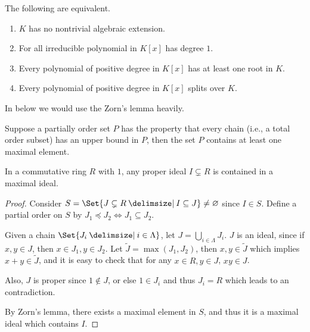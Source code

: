 \begin{prop}
  The following are equivalent.
  \begin{enumerate}
    \item $K$ has no nontrivial algebraic extension.
    \item For all irreducible polynomial in $K[x]$ has degree $1$.
    \item Every polynomial of  positive degree in $K[x]$ has at least one root in $K$.
    \item Every polynomial of  positive degree in $K[x]$ splits over $K$.
  \end{enumerate}
\end{prop}

In below we would use the Zorn's lemma heavily.
\begin{lemma}
  Suppose a partially order set $P$ has the property that every chain (i.e., a total order subset)
  has an upper bound in $P$, then the set $P$ contains at least one maximal element.
\end{lemma}

\begin{lemma} \label{lemma:max-ideal-exists}
  In a commutative ring $R$ with $1$, any proper ideal $I \subsetneq R$ is contained in a maximal ideal.

  \begin{proof}
    Consider $S = \Set{J \subsetneq R \given I \subseteq J} \neq \varnothing$ since $I \in S$.
    Define a partial order on $S$ by $J_1 \preceq J_2 \iff J_1 \subseteq J_2$.

    Given a chain $\Set{J_i \given i \in \Lambda}$, let $J = \bigcup_{i \in \Lambda} J_i$. $J$ is an
    ideal, since if $x, y \in J$, then $x \in J_1, y \in J_2$.
    Let $\tilde{J} = \max(J_1, J_2)$, then $x, y \in \tilde{J}$
    which implies $x + y \in \tilde{J}$, and it is easy to check that for any $x \in R, y \in J$, $xy \in J$.

    Also, $J$ is proper since $1 \not\in J$, or else $1 \in J_i$ and thus $J_i = R$ which leads to
    an contradiction.

    By Zorn's lemma, there exists a maximal element in $S$, and thus it is a maximal ideal which contains $I$.
  \end{proof}
\end{lemma}

